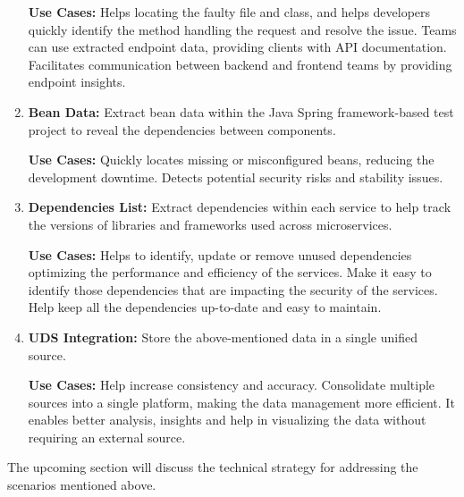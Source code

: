 \begin{enumerate}[before={\vspace{10pt}}, after={\vspace{10pt}}, itemsep=10pt, nosep, leftmargin=\parindent, labelindent=0pt]
    \textbf{Use Cases:} Helps locating the faulty file and class, and helps developers quickly identify the method handling the request and resolve the issue. Teams can use extracted endpoint data, providing clients with API documentation. Facilitates communication between backend and frontend teams by providing endpoint insights.
    \vspace{10pt}
    \item \textbf{Bean Data:} Extract bean data within the Java Spring framework-based test project to reveal the dependencies between components.
    
    \textbf{Use Cases:} Quickly locates missing or misconfigured beans, reducing the development downtime. Detects potential security risks and stability issues.
    \vspace{10pt}
    \item \textbf{Dependencies List:} Extract dependencies within each service to help track the versions of libraries and frameworks used across microservices.
    
    \textbf{Use Cases:} Helps to identify, update or remove unused dependencies optimizing the performance and efficiency of the services. Make it easy to identify those dependencies that are impacting the security of the services. Help keep all the dependencies up-to-date and easy to maintain.
    \vspace{10pt}
    \item \textbf{UDS Integration:} Store the above-mentioned data in a single unified source.
    
    \textbf{Use Cases:} Help increase consistency and accuracy. Consolidate multiple sources into a single platform, making the data management more efficient. It enables better analysis, insights and help in visualizing the data without requiring an external source.
\end{enumerate}

The upcoming section will discuss the technical strategy for addressing the scenarios mentioned above.